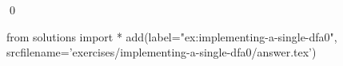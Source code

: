 
\begin{ex} 
  \label{ex:implementing-a-single-dfa0}
  
  \qed
\end{ex} 
\begin{python0}
from solutions import *
add(label="ex:implementing-a-single-dfa0",
    srcfilename='exercises/implementing-a-single-dfa0/answer.tex') 
\end{python0}
